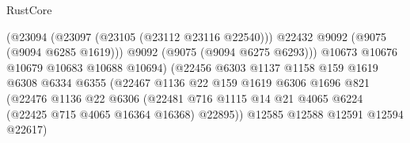 \begin{lexlean}{RustCore}
\begin{coremodule}
                                              (@23094
                                                (@23097 (@23105 (@23112 @23116 @22540)))
                                                @22432
                                                @9092
                                                (@9075 (@9094 @6285 @1619)))
                                              @9092
                                              (@9075 (@9094 @6275 @6293)))
                                            @10673
                                            @10676
                                            @10679
                                            @10683
                                            @10688
                                            @10694)
                                          (@22456
                                            @6303
                                            @1137
                                            @1158
                                            @159
                                            @1619
                                            @6308
                                            @6334
                                            @6355
                                            (@22467
                                              @1136
                                              @22
                                              @159
                                              @1619
                                              @6306
                                              @1696
                                              @821
                                              (@22476
                                                @1136
                                                @22
                                                @6306
                                                (@22481
                                                  @716
                                                  @1115
                                                  @14
                                                  @21
                                                  @4065
                                                  @6224
                                                  (@22425 @715 @4065 @16364 @16368)
                                                  @22895))
                                              @12585
                                              @12588
                                              @12591
                                              @12594
                                              @22617)

\end{coremodule}
\end{lexlean}

